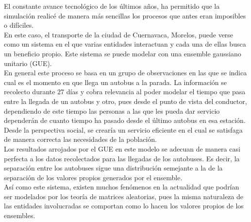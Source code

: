 \documentclass[paper=letter, fontsize=14pt]{scrartcl}
\numberwithin{equation}{section} %
\numberwithin{figure}{section} %
\numberwithin{table}{section} %
\begin{document}
El constante avance tecnológico de los últimos años, ha permitido que la simulación realicé de manera más sencillas los procesos que antes eran imposibles o difíciles.\\

En este caso, el transporte de la ciudad de Cuernavaca, Morelos, puede verse como un sistema en el que varias entidades interactuan y cada una de ellas busca un beneficio propio. Este sistema se puede modelar con una ensemble gaussiano unitario (GUE).\\

En general este proceso se basa en un grupo de observaciones en las que se indica cual es el momento en que llega un autobus a la parada. La información se recolecto durante 27 días y cobra relevancia al poder modelar el tiempo que pasa entre la llegada de un autobus y otro, pues desde el punto de vista del conductor, dependiendo de este tiempo las personas a las que les pueda dar servicio dependerán de cuanto tiempo ha pasado desde el último autobus en esa estación. Desde la perspectiva social, se crearía un servicio eficiente en el cual se satisfaga de manera correcta las necesidades de la población.\\

Los resultados arrojados por el GUE en este modelo se adecuan de manera casi perfecta a los datos recolectados para las llegadas de los autobuses. Es decir, la separación entre los autobuses sigue una distribución semejante a la de la separación de los valores propios generados por el ensemble.\\

Así como este sistema, existen muchos fenómenos en la actualidad que podrían ser modelados por los teoría de matrices aleatorias, pues la misma naturaleza de las entidades involucradas se comportan como lo hacen los valores propios de los ensembles.
\end{document}
